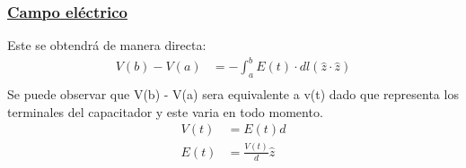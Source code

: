 \documentclass[
  11pt,
  letterpaper,
   addpoints,
   answers
  ]{exam}
\begin{document}
\begin{questions}
\begin{solution}
\begin{enumerate}
            \subsubsection*{\underline{Campo eléctrico}}
            Este se obtendrá de manera directa:
            \begin{align}
                V(b) - V(a) &= - \int^{b}_{a} E(t)\cdot dl (\hat{z} 
             \cdot \hat{z})\\
            \end{align}
            Se puede observar que  V(b) - V(a) sera equivalente a v(t) dado que representa los terminales del capacitador y este varia en todo momento.
            \begin{align}
                V(t) &= E(t) d\\
                E(t) &= \frac{V(t)}{d}\hat{z}
            \end{align}

\end{enumerate}
\end{solution}
\end{questions}
\end{document}
